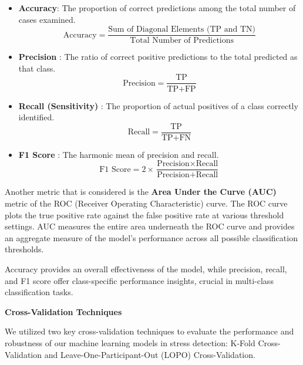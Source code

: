 \begin{itemize}
    \item \textbf{Accuracy}: The proportion of correct predictions among the total number of cases examined.
    \[ \text{Accuracy} = \frac{\text{Sum of Diagonal Elements (TP and TN)}}{\text{Total Number of Predictions}} \]

    \item \textbf{Precision} : The ratio of correct positive predictions to the total predicted as that class.
    \[ \text{Precision} = \frac{\text{TP}}{\text{TP} + \text{FP}} \]

    \item \textbf{Recall (Sensitivity)} : The proportion of actual positives of a class correctly identified.
    \[ \text{Recall} = \frac{\text{TP}}{\text{TP} + \text{FN}} \]

    \item \textbf{F1 Score} : The harmonic mean of precision and recall.
    \[ \text{F1 Score} = 2 \times \frac{\text{Precision} \times \text{Recall}}{\text{Precision} + \text{Recall}} \]
\end{itemize}

Another metric that is considered is the \textbf{Area Under the Curve (AUC)} metric of the ROC (Receiver Operating Characteristic) curve.  The ROC curve plots the true positive rate against the false positive rate at various threshold settings. AUC measures the entire  area underneath the ROC curve and provides an aggregate measure of the model's performance across all possible classification thresholds.

Accuracy provides an overall effectiveness of the model, while precision, recall, and F1 score offer class-specific performance insights, crucial in multi-class classification tasks.


\textbf{Cross-Validation Techniques}

We utilized two key cross-validation techniques to evaluate the performance and robustness of our machine learning models in stress detection: K-Fold Cross-Validation and Leave-One-Participant-Out (LOPO) Cross-Validation.

